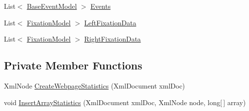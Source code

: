 \begin{DoxyCompactItemize}
List$<$ \hyperlink{class_web_analyzer_1_1_models_1_1_event_model_1_1_base_event_model}{Base\+Event\+Model} $>$ \hyperlink{class_web_analyzer_1_1_models_1_1_data_model_1_1_webpage_model_aa80b98da4b9e9c2d6b6950f4e52c0b61}{Events}
\item 
List$<$ \hyperlink{class_web_analyzer_1_1_models_1_1_analysis_model_1_1_fixation_model}{Fixation\+Model} $>$ \hyperlink{class_web_analyzer_1_1_models_1_1_data_model_1_1_webpage_model_af4888add7ed76fe7b841410abc944b99}{Left\+Fixation\+Data}
\item 
List$<$ \hyperlink{class_web_analyzer_1_1_models_1_1_analysis_model_1_1_fixation_model}{Fixation\+Model} $>$ \hyperlink{class_web_analyzer_1_1_models_1_1_data_model_1_1_webpage_model_abe8cc7ad2f30655dbd1ba0c1111429d6}{Right\+Fixation\+Data}
\end{DoxyCompactItemize}
\subsection*{Private Member Functions}
\begin{DoxyCompactItemize}
\item 
Xml\+Node \hyperlink{class_web_analyzer_1_1_models_1_1_data_model_1_1_webpage_model_af8b9bb060e28384f7ecf0635856187d4}{Create\+Webpage\+Statistics} (Xml\+Document xml\+Doc)
\item 
void \hyperlink{class_web_analyzer_1_1_models_1_1_data_model_1_1_webpage_model_a52e372578a17a8174ba376ca4d699b31}{Insert\+Array\+Statistics} (Xml\+Document xml\+Doc, Xml\+Node node, long\mbox{[}$\,$\mbox{]} array)
\end{DoxyCompactItemize}

